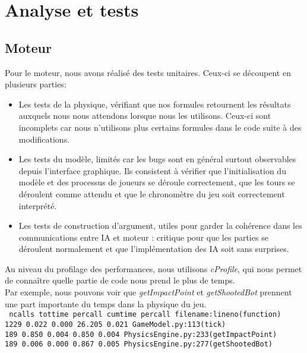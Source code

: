 \section{Analyse et tests}

\subsection{Moteur}
Pour le moteur, nous avons réalisé des tests unitaires. Ceux-ci se découpent en plusieurs parties:\\
\begin{itemize}
\item Les tests de la physique, vérifiant que nos formules retournent les résultats auxquels nous nous attendons lorsque nous les utilisons. Ceux-ci sont incomplets car nous n'utilisons plus certains formules dans le code suite à des modifications.\\

\item Les tests du modèle, limités car les bugs sont en général surtout observables depuis l'interface graphique. Ils consistent à vérifier que l'initialisation du modèle et des processus de joueurs se déroule correctement, que les tours se déroulent comme attendu et que le chronomètre du jeu soit correctement interprété.\\

\item Les tests de construction d'argument, utiles pour garder la cohérence dans les communications entre IA et moteur : critique pour que les parties se déroulent normalement et que l'implémentation des IA soit sans surprises.\\
\end{itemize}

Au niveau du profilage des performances, nous utilisons \textit{cProfile}, qui nous permet de connaître quelle partie de code nous prend le plus de temps.\\
Par exemple, nous pouvons voir que \textit{getImpactPoint} et \textit{getShootedBot} prennent une part importante du temps dans la physique du jeu.\\

\texttt{
    ncalls  tottime  percall  cumtime  percall filename:lineno(function)\\
     1229    0.022   0.000    26.205    0.021  GameModel.py:113(tick)\\
      189    0.850    0.004    0.850    0.004  PhysicsEngine.py:233(getImpactPoint)\\
      189    0.006    0.000    0.867    0.005  PhysicsEngine.py:277(getShootedBot)\\
}

